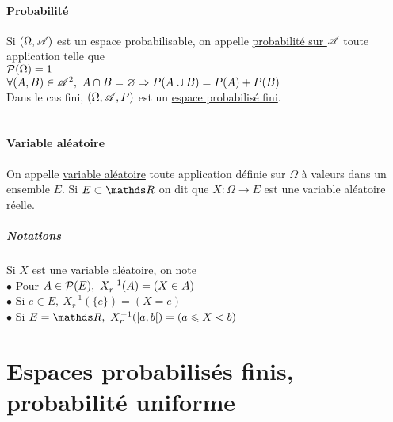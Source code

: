 		\paragraph{Probabilité}
			Si $(\Omega,{\mathscr{A}})$ est un espace probabilisable, on appelle \uline{probabilité sur ${\mathscr{A}}$} toute application telle que \\
			\hspace*{2cm} \un ${\mathcal{P}}(\Omega) = 1$ \\ \hspace*{2cm} \deux $\forall (A,B)\in{\mathscr{A}}^2 ,~ A\cap B=\varnothing \Rightarrow P(A\cup B)=P(A)+P(B)$ \trait
		\vspace*{-1cm} \\ Dans le cas fini, $(\Omega,{\mathscr{A}},P)$ est un \uline{espace probabilisé fini}.
		\vspace*{0.5cm} \\  \\ \traitd
		\paragraph{Variable aléatoire}
			On appelle \uline{variable aléatoire} toute application définie sur $\Omega$ à valeurs dans un ensemble $E$. Si $E\subset \R$ on dit que $X:\Omega \to E$ est une variable aléatoire réelle. \trait \vspace*{-1.7cm} \\
		\subparagraph{Notations}
			Si $X$ est une variable aléatoire, on note \\
			$\bullet$ Pour $A\in {\mathcal{P}}(E) ,~X_r^{-1}(A) = (X\in A)$\\
			$\bullet$ Si $e\in E ,~X_r^{-1}(\{e\}) = (X=e)$\\
			$\bullet$ Si $E=\R,~ X_r^{-1}([a,b[) = (a\leqslant X <b)$ \\
	\section{Espaces probabilisés finis, probabilité uniforme}
